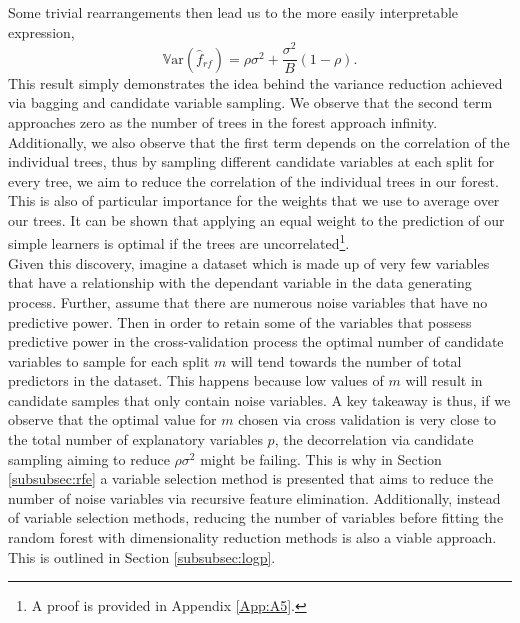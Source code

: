 \documentclass[a4paper,12pt, headsepline]{scrartcl}
\numberwithin{equation}{section}
\begin{document}
Some trivial rearrangements then lead us to the more easily interpretable expression,
\[
\mathbb{V}\text{ar}(\hat f_{rf}) = \rho\sigma^2 + \frac{\sigma^2}{B}(1 - \rho).
\]
This result simply demonstrates the idea behind the variance reduction achieved via bagging and candidate variable sampling. We observe that the second term approaches zero as the number of trees in the forest approach infinity. Additionally, we also observe that the first term depends on the correlation of the individual trees, thus by sampling different candidate variables at each split for every tree, we aim to reduce the correlation of the individual trees in our forest. This is also of particular importance for the weights that we use to average over our trees. It can be shown that applying an equal weight to the prediction of our simple learners is optimal if the trees are uncorrelated\footnote{A proof is provided in Appendix \ref{App:A5}.}.\\
Given this discovery, imagine a dataset which is made up of very few variables that have a relationship with the dependant variable in the data generating process. Further, assume that there are numerous noise variables that have no predictive power. Then in order to retain some of the variables that possess predictive power in the cross-validation process the optimal number of candidate variables to sample for each split $m$ will tend towards the number of total predictors in the dataset. This happens because low values of $m$ will result in candidate samples that only contain noise variables. A key takeaway is thus, if we observe that the optimal value for $m$ chosen via cross validation is very close to the total number of explanatory variables $p$, the decorrelation via candidate sampling aiming to reduce $\rho\sigma^2$ might be failing. This is why in Section \ref{subsubsec:rfe} a variable selection method is presented that aims to reduce the number of noise variables via recursive feature elimination. Additionally, instead of variable selection methods, reducing the number of variables before fitting the random forest with dimensionality reduction methods is also a viable approach. This is outlined in Section \ref{subsubsec:logp}.
\end{document}
